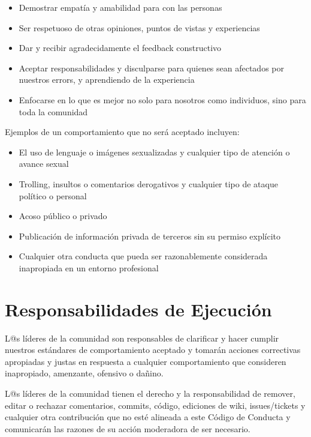\documentclass[
]{book}
\providecommand{\tightlist}{%
  \setlength{\itemsep}{0pt}\setlength{\parskip}{0pt}}
\begin{document}
\begin{itemize}
\tightlist
\item
  Demostrar empatía y amabilidad para con las personas
\item
  Ser respetuoso de otras opiniones, puntos de vistas y experiencias
\item
  Dar y recibir agradecidamente el feedback constructivo
\item
  Aceptar responsabilidades y disculparse para quienes sean afectados por nuestros errors, y aprendiendo de la experiencia
\item
  Enfocarse en lo que es mejor no solo para nosotros como individuos, sino para toda la comunidad
\end{itemize}

Ejemplos de un comportamiento que no será aceptado incluyen:

\begin{itemize}
\tightlist
\item
  El uso de lenguaje o imágenes sexualizadas y cualquier tipo de atención o avance sexual
\item
  Trolling, insultos o comentarios derogativos y cualquier tipo de ataque político o personal
\item
  Acoso público o privado
\item
  Publicación de información privada de terceros sin su permiso explícito
\item
  Cualquier otra conducta que pueda ser razonablemente considerada inapropiada en un entorno profesional
\end{itemize}

\hypertarget{responsabilidades-de-ejecuciuxf3n}{%
\section{Responsabilidades de Ejecución}\label{responsabilidades-de-ejecuciuxf3n}}

L@s líderes de la comunidad son responsables de clarificar y hacer cumplir nuestros estándares de comportamiento aceptado y tomarán acciones correctivas apropiadas y justas en respuesta a cualquier comportamiento que consideren inapropiado, amenzante, ofensivo o dañino.

L@s líderes de la comunidad tienen el derecho y la responsabilidad de remover, editar o rechazar comentarios, commits, código, ediciones de wiki, issues/tickets y cualquier otra contribución que no esté alineada a este Código de Conducta y comunicarán las razones de su acción moderadora de ser necesario.
\end{document}
